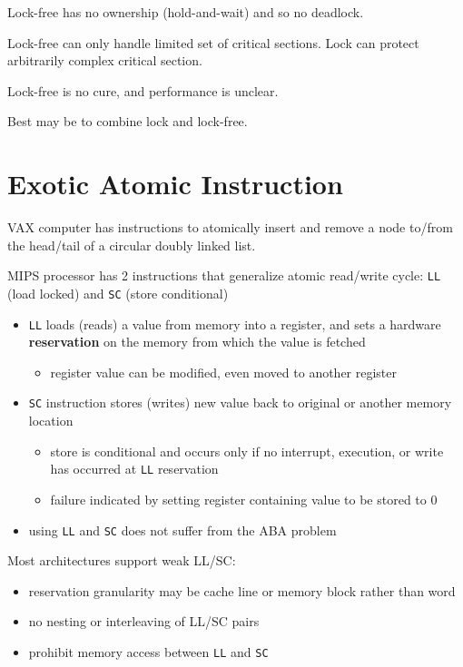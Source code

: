\documentclass[11pt]{article}
\begin{document}
Lock-free has no ownership (hold-and-wait) and so no deadlock.

Lock-free can only handle limited set of critical sections.
Lock can protect arbitrarily complex critical section.

Lock-free is no cure, and performance is unclear.

Best may be to combine lock and lock-free.
\section{Exotic Atomic Instruction}
\label{sec:orgea1cbb0}
VAX computer has instructions to atomically insert and remove a node to/from the head/tail of a circular
doubly linked list.

MIPS processor has 2 instructions that generalize atomic read/write cycle: \texttt{LL} (load locked) and
\texttt{SC} (store conditional)
\begin{itemize}
\item \texttt{LL} loads (reads) a value from memory into a register, and sets a hardware \textbf{reservation} on the
memory from which the value is fetched
\begin{itemize}
\item register value can be modified, even moved to another register
\end{itemize}
\item \texttt{SC} instruction stores (writes) new value back to original or another memory location
\begin{itemize}
\item store is conditional and occurs only if no interrupt, execution, or write has occurred at \texttt{LL}
reservation
\item failure indicated by setting register containing value to be stored to 0
\end{itemize}
\item using \texttt{LL} and \texttt{SC} does not suffer from the ABA problem
\end{itemize}

Most architectures support weak LL/SC:
\begin{itemize}
\item reservation granularity may be cache line or memory block rather than word
\item no nesting or interleaving of LL/SC pairs
\item prohibit memory access between \texttt{LL} and \texttt{SC}
\end{itemize}
\end{document}
